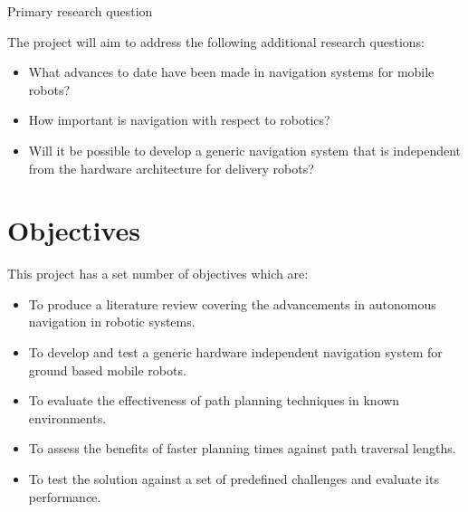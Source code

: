 \noindent
Primary research question

\noindent
The project will aim to address the following additional research questions:

\begin{itemize}
\item What advances to date have been made in navigation systems for mobile robots?

\item How important is navigation with respect to robotics?

\item Will it be possible to develop a generic navigation system that is independent from the hardware architecture for delivery robots?

\end{itemize}


\section{Objectives}

\noindent
This project has a set number of objectives which are:

\begin{itemize}
\item To produce a literature review covering the advancements in autonomous navigation in robotic systems.

\item To develop and test a generic hardware independent navigation system for ground based mobile robots. 

\item To evaluate the effectiveness of path planning techniques in known environments. 

\item To assess the benefits of faster planning times against path traversal lengths.

\item To test the solution against a set of predefined challenges and evaluate its performance.

\end{itemize}

\newpage


